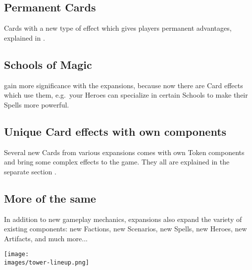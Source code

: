 \begin{multicols*}{2}
\subsection*{Permanent Cards}
Cards with a new type of effect which gives players permanent advantages, explained in .

\subsection*{Schools of Magic}
 gain more significance with the expansions, because now there are Card effects which use them, e.g.~your Heroes can specialize in certain Schools to make their Spells more powerful.

\subsection*{Unique Card effects with own components}
Several new Cards from various expansions comes with own Token components and bring some complex effects to the game.
They all are explained in the separate section .

\subsection*{More of the same}
In addition to new gameplay mechanics, expansions also expand the variety of existing components: new Factions, new Scenarios, new Spells, new Heroes, new Artifacts, and much more...

\begin{center}
    \texttt{[image: \\images/tower-lineup.png]}
\end{center}
\vspace*{\fill}
\end{multicols*}
\pagebreak

